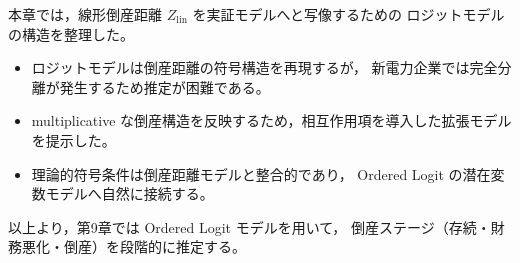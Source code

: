 本章では，線形倒産距離 $Z_{\text{lin}}$ を実証モデルへと写像するための
ロジットモデルの構造を整理した。

\begin{itemize}
    \item ロジットモデルは倒産距離の符号構造を再現するが，
          新電力企業では完全分離が発生するため推定が困難である。
    \item multiplicative な倒産構造を反映するため，相互作用項を導入した拡張モデルを提示した。
    \item 理論的符号条件は倒産距離モデルと整合的であり，
          Ordered Logit の潜在変数モデルへ自然に接続する。
\end{itemize}

以上より，第9章では Ordered Logit モデルを用いて，
倒産ステージ（存続・財務悪化・倒産）を段階的に推定する。
